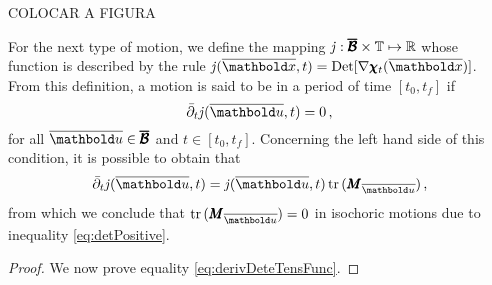 COLOCAR A FIGURA 

\noindent For the next type of motion, we define the mapping $\mathit{j} : \pmb{\overline{\mathcal{B}}}\times\mathbb{T} \mapsto \mathbb{R}$ whose function is described by the rule $\mathit{j}(\overline{\vto{x}},t)=\textnormal{Det}[\fua{\nabla\tnr{\chi}_t}{\overline{\vto{x}}}]$. From this definition, a motion is said to be  in a period of time $[t_0,t_f]$ if 
\begin{equation}
\bar{\partial}_t\mathit{j}(\overline{\vto{u}},t) = 0\,,
\end{equation}
for all $\overline{\vto{u}} \in \tnr{\overline{\mathcal{B}}}$ and $t\in[t_0,t_f]$. Concerning the left hand side of this condition, it is possible to obtain that
\begin{equation}\label{eq:derivDeteTensFunc}
\bar{\partial}_t\mathit{j}(\overline{\vto{u}},t) = \mathit{j}(\overline{\vto{u}},t)\,\trc{\tnr{M}_{\overline{\vto{u}}}}\,,
\end{equation}
from which we conclude that $\trc{\tnr{M}_{\overline{\vto{u}}}}=0$ in isochoric motions due to inequality \eqref{eq:detPositive}.

{\footnotesize
\begin{proof}
We now prove equality \eqref{eq:derivDeteTensFunc}. 
\end{proof}
}



